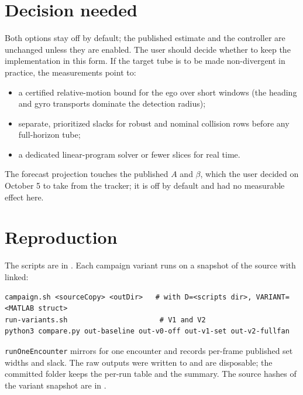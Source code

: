 \documentclass[11pt]{article}
\begin{document}
\section{Decision needed}
Both options stay off by default; the published estimate and the controller
are unchanged unless they are enabled. The user should decide whether to keep
the implementation in this form. If the target tube is to be made
non-divergent in practice, the measurements point to:
\begin{itemize}
\item a certified relative-motion bound for the ego over short windows (the
  heading and gyro transports dominate the detection radius);
\item separate, prioritized slacks for robust and nominal collision rows
  before any full-horizon tube;
\item a dedicated linear-program solver or fewer slices for real time.
\end{itemize}
The forecast projection touches the published $A$ and $\beta$, which the user
decided on October 5 to take from the tracker; it is off by default and had no
measurable effect here.

\section{Reproduction}
The scripts are in . Each campaign
variant runs on a snapshot of the source with  linked:
\begin{verbatim}
campaign.sh <sourceCopy> <outDir>   # with D=<scripts dir>, VARIANT=<MATLAB struct>
run-variants.sh                      # V1 and V2
python3 compare.py out-baseline out-v0-off out-v1-set out-v2-fullfan
\end{verbatim}
\texttt{runOneEncounter} mirrors  for
one encounter and records per-frame published set widths and slack. The raw
outputs were written to
 and are
disposable; the committed folder keeps the per-run table and the summary. The
source hashes of the variant snapshot are in .
\end{document}
